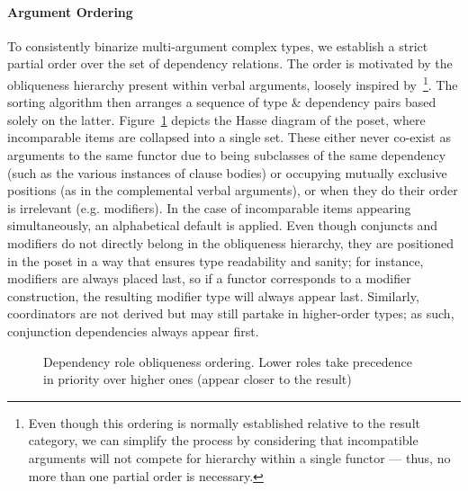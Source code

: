\paragraph{Argument Ordering}
To consistently binarize multi-argument complex types, we establish a strict partial order over the set of dependency relations.
The order is motivated by the obliqueness hierarchy present within verbal arguments, loosely inspired by~\cite{dowty}\footnote{Even though this ordering is normally established relative to the result category, we can simplify the process by considering that incompatible arguments will not compete for hierarchy within a single functor --- thus, no more than one partial order is necessary.}.
The sorting algorithm then arranges a sequence of type \& dependency pairs based solely on the latter.
Figure~\ref{fig:lattice} depicts the Hasse diagram of the poset, where incomparable items are collapsed into a single set.
These either never co-exist as arguments to the same functor due to being subclasses of the same dependency (such as the various instances of clause bodies) or occupying mutually exclusive positions (as in the complemental verbal arguments), or when they do their order is irrelevant (e.g. modifiers).
In the case of incomparable items appearing simultaneously, an alphabetical default is applied.
Even though conjuncts and modifiers do not directly belong in the obliqueness hierarchy, they are positioned in the poset in a way that ensures type readability and sanity; for instance, modifiers are always placed last, so if a functor corresponds to a modifier construction, the resulting modifier type will always appear last.
Similarly, coordinators are not derived but may still partake in higher-order types; as such, conjunction dependencies always appear first.

\begin{figure}
\centering
{}
    \caption[Dependency Role Obliqueness Ordering]{Dependency role obliqueness ordering. Lower roles take precedence in priority over higher ones (appear closer to the result)}
    \label{fig:lattice}
\end{figure}


